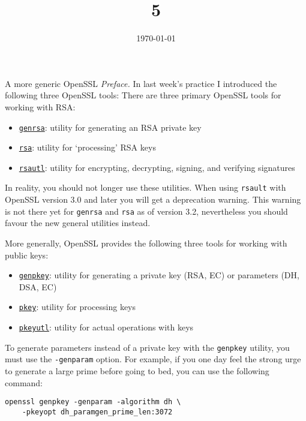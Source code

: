 \documentclass{practice}
\title{5}
\date{\today}
\begin{document}
\maketitle

\begin{task}{A more generic OpenSSL}
  \textit{Preface.}
  In last week's practice I introduced the following three OpenSSL tools:
  There are three primary OpenSSL tools for working with RSA:
  \begin{itemize}
    \item \href{https://www.openssl.org/docs/man3.0/man1/openssl-genrsa.html}{\texttt{genrsa}}: utility for generating an RSA private key
    \item \href{https://www.openssl.org/docs/man3.0/man1/openssl-rsa.html}{\texttt{rsa}}: utility for `processing' RSA keys
    \item \href{https://www.openssl.org/docs/man3.0/man1/openssl-rsautl.html}{\texttt{rsautl}}: utility for encrypting, decrypting, signing, and verifying signatures
  \end{itemize}

  In reality, you should not longer use these utilities.
  When using \texttt{rsault} with OpenSSL version 3.0 and later you will get a deprecation warning.
  This warning is not there yet for \texttt{genrsa} and \texttt{rsa} as of version 3.2, nevertheless you should favour the new general utilities instead.

  More generally, OpenSSL provides the following three tools for working with public keys:
  \begin{itemize}
    \item \href{https://www.openssl.org/docs/man3.0/man1/openssl-genpkey.html}{\texttt{genpkey}}: utility for generating a private key (RSA, EC) or parameters (DH, DSA, EC)
    \item \href{https://www.openssl.org/docs/man3.0/man1/openssl-pkey.html}{\texttt{pkey}}: utility for processing keys
    \item \href{https://www.openssl.org/docs/man3.0/man1/openssl-pkeyutl.html}{\texttt{pkeyutl}}: utility for actual operations with keys
  \end{itemize}

  To generate parameters instead of a private key with the \texttt{genpkey} utility, you must use the \texttt{-genparam} option.
  For example, if you one day feel the strong urge to generate a large prime before going to bed, you can use the following command:
  \begin{Verbatim}
openssl genpkey -genparam -algorithm dh \
    -pkeyopt dh_paramgen_prime_len:3072
  \end{Verbatim}


\end{task}
\end{document}
